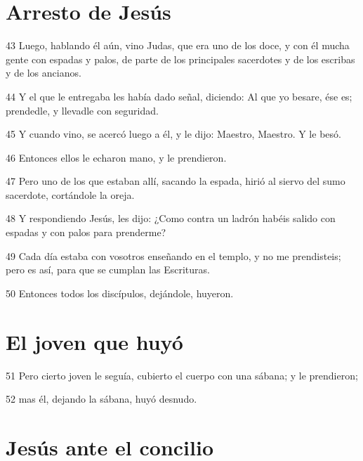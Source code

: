 \section*{Arresto de Jesús}

\par 43 Luego, hablando él aún, vino Judas, que era uno de los doce, y con él mucha gente con espadas y palos, de parte de los principales sacerdotes y de los escribas y de los ancianos.
\par 44 Y el que le entregaba les había dado señal, diciendo: Al que yo besare, ése es; prendedle, y llevadle con seguridad.
\par 45 Y cuando vino, se acercó luego a él, y le dijo: Maestro, Maestro. Y le besó.
\par 46 Entonces ellos le echaron mano, y le prendieron.
\par 47 Pero uno de los que estaban allí, sacando la espada, hirió al siervo del sumo sacerdote, cortándole la oreja.
\par 48 Y respondiendo Jesús, les dijo: ¿Como contra un ladrón habéis salido con espadas y con palos para prenderme?
\par 49 Cada día estaba con vosotros enseñando en el templo, y no me prendisteis; pero es así, para que se cumplan las Escrituras.
\par 50 Entonces todos los discípulos, dejándole, huyeron.

\section*{El joven que huyó}

\par 51 Pero cierto joven le seguía, cubierto el cuerpo con una sábana; y le prendieron;
\par 52 mas él, dejando la sábana, huyó desnudo.

\section*{Jesús ante el concilio}


